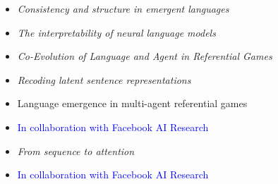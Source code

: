 {{{
{\begin{itemize}
  \item[] \textit{Consistency and structure in emergent languages}
\end{itemize}
}}


{
{\begin{itemize}
  \item[] \textit{The interpretability of neural language models}
\end{itemize}
}}

{
{\begin{itemize}
  \item[] \textit{Co-Evolution of Language and Agent in Referential Games}
\end{itemize}
}

{
{\begin{itemize}
  \item[] \textit{Recoding latent sentence representations}
\end{itemize}
}

{
{\begin{itemize}
  \item[] Language emergence in multi-agent referential games
  \item[] \textcolor{blue}{\normalfont In collaboration with Facebook AI Research\vspace{1mm}}
\end{itemize}
}

{
{\begin{itemize}
  \item[] \textit{From sequence to attention}
  \item[] \textcolor{blue}{\normalfont In collaboration with Facebook AI Research\vspace{1mm}}
\end{itemize}
}

}}}}}}
